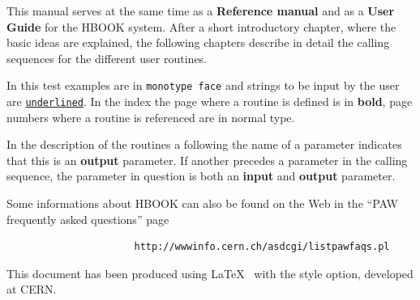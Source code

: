 This manual serves at the same time as a {\bf Reference manual}
and as a {\bf User Guide} for the HBOOK system.
After a short introductory chapter, where the basic ideas
are explained, the following chapters describe in detail
the calling sequences for the different user routines.
 
In this test examples are in {\tt monotype face} and strings to be
input by the user are {\tt\underline{underlined}}.  In the index the
page where a routine is defined is in {\bf bold}, page numbers where a
routine is referenced are in normal type.

In the description of the routines a \Lit{*} following
the name of a parameter indicates that this is an {\bf output} parameter.
If another \Lit{*} precedes a parameter in the calling sequence, the
parameter in question is both an {\bf input} and {\bf output} parameter.

Some informations about HBOOK can also be found on the Web in the ``PAW
frequently asked questions'' page
\begin{verbatim}
                      http://wwwinfo.cern.ch/asdcgi/listpawfaqs.pl
\end{verbatim}


This document has been produced using \LaTeX~\cite{bib-LATEX}
with the  style option, developed at CERN. 

\newpage
\tableofcontents
\listoffigures
\listoftables
\cleardoublepage

